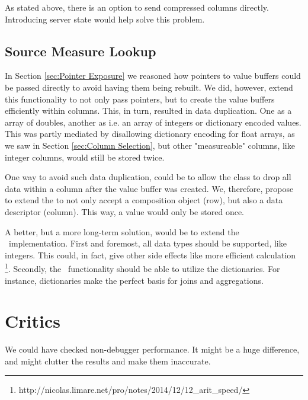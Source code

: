 As stated above, there is an option to send compressed columns directly. Introducing server state would help solve this problem.

\subsection{Source Measure Lookup}
\label{sub:Source Measure Lookup}
In Section \ref{sec:Pointer Exposure} we reasoned how pointers to value buffers could be passed directly to avoid having them being rebuilt. We did, however, extend this functionality to not only pass pointers, but to create the value buffers efficiently within columns. This, in turn, resulted in data duplication. One as a array of doubles, another as i.e. an array of integers or dictionary encoded values. This was partly mediated by disallowing dictionary encoding for float arrays, as we saw in Section \ref{sec:Column Selection}, but other "measureable" columns, like integer columns, would still be stored twice.

One way to avoid such data duplication, could be to allow the  class to drop all data within a column after the value buffer was created. We, therefore, propose to extend the  to not only accept a composition object (row), but also a data descriptor (column). This way, a value would only be stored once.

A better, but a more long-term solution, would be to extend the \bd~implementation. First and foremost, all data types should be supported, like integers. This could, in fact, give other side effects like more efficient calculation \footnote{http://nicolas.limare.net/pro/notes/2014/12/12\_arit\_speed/}. Secondly, the \bd~functionality should be able to utilize the dictionaries. For instance, dictionaries make the perfect basis for joins and aggregations. 

\section{Critics}
\label{sec:Critics}
We could have checked non-debugger performance. It might be a huge difference, and might clutter the results and make them inaccurate.

